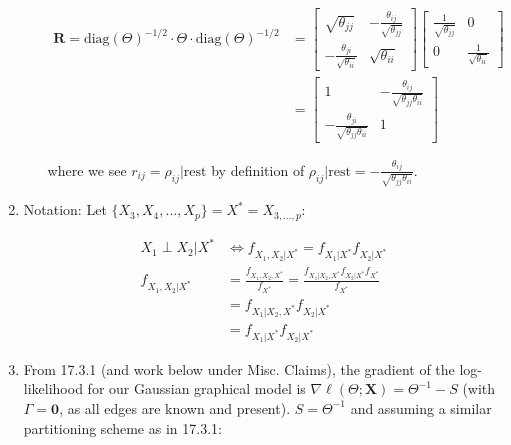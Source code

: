 \documentclass[11pt]{article}
\begin{document}
\begin{enumerate}
\begin{enumerate}[label=(\alph*)]
    \begin{align*}
        \mathbf{R}
        =
        \text{diag}(\Theta)^{-1/2}
        \cdot \Theta \cdot
        \text{diag}(\Theta)^{-1/2}
        &=
        \begin{bmatrix}
         \sqrt{\theta_{jj}} & -\frac{\theta_{ij}}{\sqrt{\theta_{jj}}} \\ 
         -\frac{\theta_{ji}}{\sqrt{\theta_{ii}}} & \sqrt{\theta_{ii}}
        \end{bmatrix}
        \begin{bmatrix}
        \frac{1}{\sqrt{\theta_{jj}}} & 0 \\
        0 & \frac{1}{\sqrt{\theta_{ii}}}
        \end{bmatrix}
    \\
        &= 
        \begin{bmatrix}
            1 
            & 
            -\frac{\theta_{ij}}{\sqrt{\theta_{jj}\theta_{ii}}} 
            \\ 
            -\frac{\theta_{ji}}{\sqrt{\theta_{jj}\theta_{ii}}} 
            & 
            1 
        \end{bmatrix}
    \end{align*}

    where we see $r_{ij} = \rho_{ij}|\text{rest}$ by definition of $\rho_{ij}|\text{rest} =-\frac{\theta_{ij}}{\sqrt{\theta_{jj}\theta_{ii}}}$. 
    \end{enumerate}

    
    \item 
    Notation: Let $\{X_3, X_4, ..., X_p\} = X^* = X_{3, ..., p}$: 
    
    \begin{align*}
        X_1 \perp X_2 | X^*
        &\Leftrightarrow 
        f_{X_1, X_2 | X^*} = f_{X_1 | X^*} f_{X_2 | X^*}
        \\
        f_{X_1, X_2 | X^*}
        &=
        \frac{
        f_{X_1, X_2, X^*}
        }{
        f_{X^*}
        }
        =
        \frac{
        f_{X_1 | X_2, X^*} f_{X_2|X^*}f_{X^*}
        }{
        f_{X^*}
        }
        \\
        &= f_{X_1 | X_2, X^*} f_{X_2 | X^*}
        \\ 
        &=
        f_{X_1 | X^*} f_{X_2 | X^*}
    \end{align*}


    \item 
    From 17.3.1 (and work below under Misc. Claims), the gradient of the log-likelihood for our Gaussian graphical model is 
    $\nabla \ell(\Theta; \mathbf{X}) = \Theta^{-1} - S$ (with $\Gamma = \mathbf{0}$, as all edges are known and present).  $S = \Theta^{-1}$ and assuming a similar partitioning scheme as in 17.3.1: 


\end{enumerate}
\end{document}
